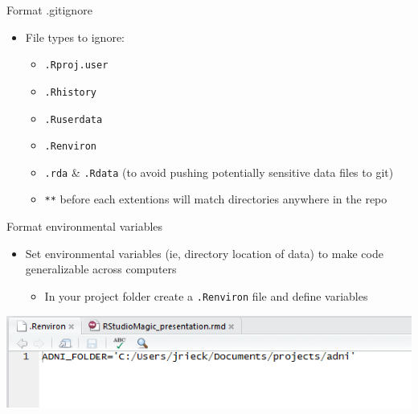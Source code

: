 \documentclass[
  ignorenonframetext,
]{beamer}
\providecommand{\tightlist}{%
  \setlength{\itemsep}{0pt}\setlength{\parskip}{0pt}}
\begin{document}
\begin{frame}[fragile]{Format .gitignore}
\protect\hypertarget{format-.gitignore}{}

\begin{itemize}[<+->]
\tightlist
\item
  File types to ignore:

  \begin{itemize}[<+->]
  \tightlist
  \item
    \texttt{.Rproj.user}
  \item
    \texttt{.Rhistory}
  \item
    \texttt{.Ruserdata}
  \item
    \texttt{.Renviron}
  \item
    \texttt{.rda} \& \texttt{.Rdata} (to avoid pushing potentially
    sensitive data files to git)
  \item
    \texttt{**} before each extentions will match directories anywhere
    in the repo
  \end{itemize}
\end{itemize}

\end{frame}

\begin{frame}[fragile]{Format environmental variables}
\protect\hypertarget{format-environmental-variables}{}

\begin{itemize}[<+->]
\tightlist
\item
  Set environmental variables (ie, directory location of data) to make
  code generalizable across computers

  \begin{itemize}[<+->]
  \tightlist
  \item
    In your project folder create a \texttt{.Renviron} file and define
    variables
  \end{itemize}
\end{itemize}

\includegraphics{../external/images/rstudio_setup_project_environ.PNG}

\end{frame}
\end{document}
